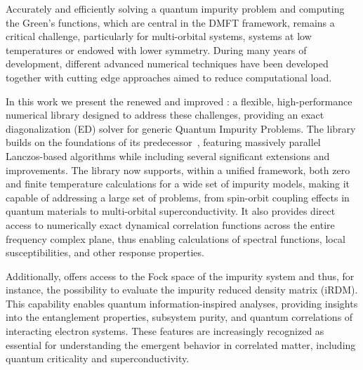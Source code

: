 \documentclass[edipack_sp.tex]{subfiles}
\begin{document}
Accurately and efficiently solving a quantum impurity problem and computing the Green's functions, which are central in the DMFT framework, remains a
critical challenge, particularly for multi-orbital systems, systems
at low temperatures or endowed with lower symmetry. During many years of development, different advanced numerical techniques have been developed together with cutting edge approaches aimed to reduce computational load. 

In this work we present the renewed and improved \NAME{}: a flexible, high-performance numerical library designed to address these challenges, providing an exact diagonalization (ED) solver for generic Quantum Impurity Problems. 
The library builds on the foundations of
its predecessor~\cite{amaricci2022CPC}, featuring massively parallel Lanczos-based algorithms while including several significant extensions and improvements. The library now supports, within a unified framework, both zero and finite temperature calculations for a wide set of impurity models, making it capable of addressing a large set of problems, from spin-orbit coupling effects in quantum materials to multi-orbital superconductivity. It also provides direct
access to numerically exact
dynamical correlation functions across the
entire frequency complex plane, thus enabling calculations of spectral functions, local susceptibilities, and other response properties.

Additionally, \NAME offers access to the Fock space of
the impurity system and thus, for instance, the possibility to evaluate the impurity reduced density matrix
(iRDM). This capability enables quantum information-inspired analyses, providing insights into the entanglement properties, subsystem purity, and quantum correlations of interacting electron systems. These
features are increasingly recognized as essential for understanding the emergent behavior in correlated matter, including quantum criticality and superconductivity.
\end{document}

